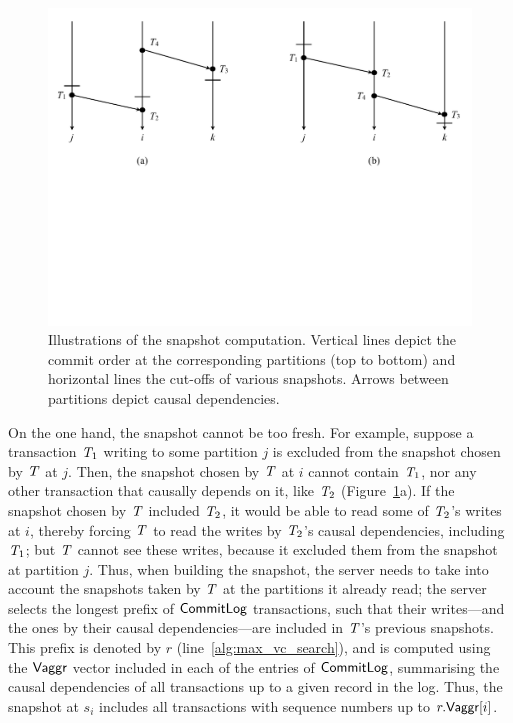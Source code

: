 \begin{figure}[t]
\vspace{-0.5cm}
\includegraphics[width=\textwidth]{figures/ch4_snapshot.pdf}
\vspace{-6.5cm}
\caption{Illustrations of the snapshot computation. Vertical lines depict the
  commit order at the corresponding partitions (top to bottom) and horizontal
  lines the cut-offs of various snapshots. Arrows between partitions depict
  causal dependencies.}
\label{fig:snapshot}
\end{figure}

On the one hand, the snapshot cannot be too fresh. For example, suppose a transaction $\mathit{T}_1$ writing to some partition $j$ is excluded from the snapshot chosen by $\mathit{T}$ at $j$. Then, the snapshot chosen by $\mathit{T}$ at $i$ cannot contain $\mathit{T}_1$, nor any other transaction that causally depends on it, like $\mathit{T}_2$ (Figure~\ref{fig:snapshot}a). If the snapshot chosen by $\mathit{T}$ included $\mathit{T}_2$, it would be able to read some of $\mathit{T}_2$'s writes at $i$, thereby forcing $\mathit{T}$ to read the writes by $\mathit{T}_2$'s causal dependencies, including $\mathit{T}_1$; but $\mathit{T}$ cannot see these writes, because it excluded them from the snapshot at partition $j$. Thus, when building the snapshot, the server needs to take into account the snapshots taken by $\mathit{T}$ at the partitions it already read; the server selects the longest prefix of $\mathsf{CommitLog}$ transactions, such that their writes---and the ones by their causal dependencies---are included in $\mathit{T}$'s previous snapshots. This prefix is denoted by $r$ (line~\ref{alg:max_vc_search}), and is computed using the $\mathsf{Vaggr}$ vector included in each of the entries of $\mathsf{CommitLog}$, summarising the causal dependencies of all transactions up to a given record in the log. Thus, the snapshot at $s_i$ includes all transactions with sequence numbers up to $r.\mathsf{Vaggr}[i]$.

